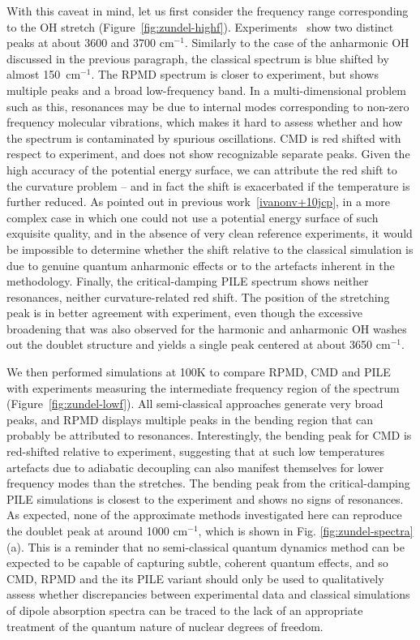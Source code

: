 \documentclass[aps,prb,superscriptaddress,amsmath,amssymb,showpacs,twocolumn]{revtex4}
\begin{document}
With this caveat in mind, let us first consider the frequency range corresponding 
to the OH stretch (Figure~\ref{fig:zundel-highf}). Experiments~\cite{YehLee1989} show two distinct peaks at about 
3600 and 3700 cm$^{-1}$. Similarly to the case of the anharmonic OH discussed 
in the previous paragraph, the classical spectrum is blue shifted by almost 
150~cm$^{-1}$. The RPMD spectrum is closer to experiment, but shows multiple peaks and a broad
low-frequency band. In a multi-dimensional problem such as this, resonances may be due to 
internal modes corresponding to non-zero frequency molecular vibrations, which makes it hard
to assess whether and how the spectrum is contaminated by spurious oscillations. 
CMD is red shifted with respect to experiment, and does not show recognizable separate peaks.
Given the high accuracy of the potential energy surface, we can attribute the red shift to the
curvature problem -- and in fact the shift is exacerbated if the temperature is further reduced. 
As pointed out in previous work~\ref{ivanonv+10jcp}, in a more complex case in which one could not
use a potential energy surface of such exquisite quality, and in the absence of very clean 
reference experiments, it would be impossible to determine whether the shift relative to the classical
simulation is due to genuine quantum anharmonic effects or to the artefacts inherent in the methodology.
Finally, the critical-damping PILE spectrum shows neither resonances, neither curvature-related red shift. 
The position of the stretching peak  is in better agreement with experiment, even though the excessive 
broadening that was also observed for the harmonic and anharmonic
OH washes out the doublet structure and yields a single peak centered at about 3650 cm$^{-1}$.

We then performed simulations at 100K to compare RPMD, CMD and PILE with experiments
measuring the intermediate frequency region of the spectrum~\cite{AsmisScience2003} (Figure~\ref{fig:zundel-lowf}). 
All semi-classical approaches generate very broad peaks, and RPMD 
displays multiple peaks in the bending region that can probably be attributed to resonances.
Interestingly, the bending peak for CMD is red-shifted relative to experiment, suggesting 
that at such low temperatures artefacts due to adiabatic decoupling can also manifest themselves 
for lower frequency modes than the stretches. The bending peak from the critical-damping
PILE simulations is closest to the experiment and shows no signs of resonances.
As expected, none of the approximate methods investigated here can reproduce the
doublet peak at around 1000 cm$^{-1}$, which is shown in Fig. \ref{fig:zundel-spectra}(a).
This is a reminder that no semi-classical quantum dynamics method can be expected to be capable
of capturing subtle, coherent quantum effects, and so CMD, RPMD and the its PILE variant should
only be used to qualitatively assess whether discrepancies between experimental data and 
classical simulations of dipole absorption spectra can be traced to the lack of an
appropriate treatment of the quantum nature of nuclear degrees of freedom.
\end{document}
